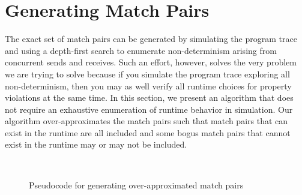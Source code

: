 \section{Generating Match Pairs}


The exact set of match pairs can be generated by simulating the program trace and using a depth-first search to enumerate non-determinism arising from concurrent sends and receives. Such an effort, however, solves the very problem we are trying to solve because if you simulate the program trace exploring all non-determinism, then you may as well verify all runtime choices for property violations at the same time. In this section, we present an algorithm that does not require an exhaustive enumeration of runtime behavior in simulation. Our algorithm over-approximates the match pairs such that match pairs that can exist in the runtime are all included and some bogus match pairs that cannot exist in the runtime may or may not be included. %

\begin{figure}
\setlength{\tabcolsep}{20pt}
\begin{center}
\scalebox{0.7}{\usebox{\boxalgorithm}}\\
\end{center}
\caption{Pseudocode for generating over-approximated match pairs}
\label{fig:pseudocode}
\end{figure}

